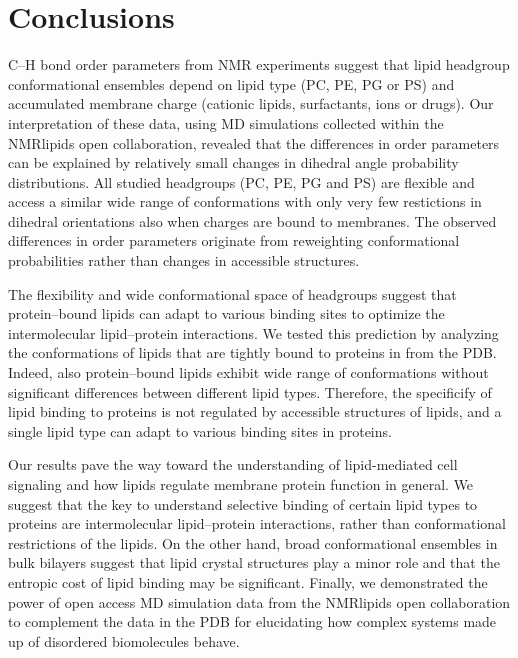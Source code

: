 \documentclass[aps,prl,superscriptaddress,twocolumn]{revtex4}
\begin{document}


\section{Conclusions}

C--H bond order parameters from NMR experiments %
suggest that lipid headgroup conformational ensembles depend on lipid type (PC, PE, PG or PS) 
and accumulated membrane charge (cationic lipids, surfactants, ions or drugs). 
Our interpretation of these data, using MD simulations collected
within the NMRlipids open collaboration,
revealed that the differences in order parameters can be explained
by relatively small changes in dihedral angle probability distributions.
All studied headgroups (PC, PE, PG and PS) are flexible
and access a similar wide range of conformations with only very few restictions in dihedral orientations
also when charges are bound to membranes.
The observed differences in order parameters originate from
reweighting conformational probabilities rather than changes in accessible structures.

The flexibility and wide conformational space of headgroups suggest that protein--bound lipids can
adapt to various binding sites to optimize the intermolecular lipid--protein interactions.
We tested this prediction by analyzing the conformations of lipids that are tightly bound to proteins in from the PDB.
Indeed, also protein--bound lipids exhibit wide range of conformations without significant 
differences between different lipid types. Therefore, the specificify of lipid binding to proteins is not
regulated by accessible structures of lipids, and a single lipid type can adapt to various binding sites in proteins.

Our results pave the way toward the understanding of lipid-mediated cell signaling and how lipids regulate membrane protein function in general.
We suggest that the key to understand selective binding of certain lipid types to proteins
are intermolecular lipid--protein interactions, rather than conformational restrictions of the lipids.
On the other hand, broad conformational ensembles in bulk bilayers suggest that lipid crystal structures
play a minor role and that the entropic cost of lipid binding may be significant.
Finally, we demonstrated the power of open access MD simulation data from the NMRlipids open collaboration
to complement the data in the PDB for elucidating how complex systems made up of disordered biomolecules behave.
\end{document}

